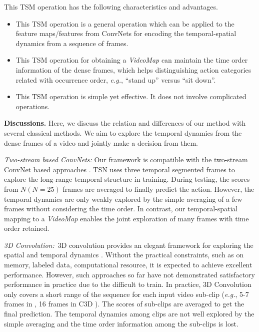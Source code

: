 \documentclass[english, 10pt, twocolumn, twoside]{IEEEtran}
\begin{document}
This TSM operation has the following characteristics and advantages.
\begin{itemize}
 \setlength{\itemsep}{0pt}
 \setlength{\parsep}{0pt}
 \setlength{\parskip}{0pt}
 \item This TSM operation is a general operation which can be applied to the feature maps/features from ConvNets for encoding the temporal-spatial dynamics from a sequence of frames.
 \item This TSM operation for obtaining a \emph{VideoMap} can maintain the time order information of the dense frames, which helps distinguishing action categories related with occurrence order, \emph{e.g.}, ``stand up'' versus ``sit down''.\item This TSM operation is simple yet effective. It does not involve complicated operations.
\end{itemize}

\noindent\textbf{Discussions.} Here, we discuss the relation and differences of our method with several classical methods. We aim to explore the temporal dynamics from the dense frames of a video and jointly make a decision from them.

\emph{Two-stream based ConvNets:} Our framework is compatible with the two-stream ConvNet based approaches \cite{simonyan2014two,wang2016temporal}. TSN \cite{wang2016temporal} uses three temporal segmented frames to explore the long-range temporal structure in training. During testing, the scores from $N (N=25)$ frames are averaged to finally predict the action. However, the temporal dynamics are only weakly explored by the simple averaging of a few frames without considering the time order. In contrast, our temporal-spatial mapping to a \emph{VideoMap} enables the joint exploration of many frames with time order retained.

\emph{3D Convolution:}~3D convolution provides an elegant framework for exploring the spatial and temporal dynamics \cite{ji20133d,tran2015learning}. Without the practical constraints, such as on memory, labeled data, computational resource, it is expected to achieve excellent performance. However, such approaches so far have not demonstrated satisfactory performance in practice due to the difficult to train. In practice, 3D Convolution only covers a short range of the sequence for each input video sub-clip (\emph{e.g.}, 5-7 frames in \cite{ji20133d}, 16 frames in C3D \cite{tran2015learning}). The scores of sub-clips are averaged to get the final prediction. The temporal dynamics among clips are not well explored by the simple averaging and the time order information among the sub-clips is lost.
\end{document}
